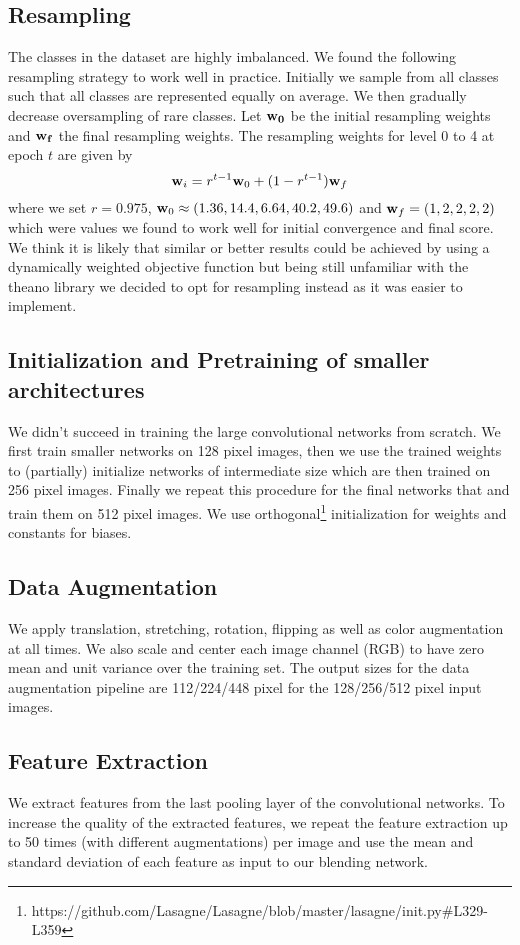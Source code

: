 \documentclass[12pt,a4paper]{scrartcl}
\begin{document}
\subsection{Resampling}
The classes in the dataset are highly imbalanced. We found the following resampling strategy to work well in practice. Initially we sample from all classes such that all classes are represented equally on average. We then gradually decrease oversampling of rare classes. Let ${\bf w_0}$ be the initial resampling weights and ${\bf w_f}$ the final resampling weights. The resampling weights for level 0 to 4 at epoch $t$ are given by
\begin{equation}
{\bf w}_i = r^{t-1} {\bf w}_0 + (1 - r^{t-1}) {\bf w}_f
\end{equation}
where we set $r=0.975$, ${\bf w}_0 \approx (1.36, 14.4, 6.64, 40.2, 49.6)$ and ${\bf w}_f = (1, 2, 2, 2, 2)$ which were values we found to work well for initial convergence and final score. We think it is likely that similar or better results could be achieved by using a dynamically weighted objective function but being still unfamiliar with the theano library we decided to opt for resampling instead as it was easier to implement.
\subsection{Initialization and Pretraining of smaller architectures}
We didn't succeed in training the large convolutional networks from scratch. We first train smaller networks on 128 pixel images, then we use the trained weights to (partially) initialize networks of intermediate size which are then trained on 256 pixel images. Finally we repeat this procedure for the final networks that and train them on 512 pixel images. We use orthogonal\footnote{https://github.com/Lasagne/Lasagne/blob/master/lasagne/init.py\#L329-L359} initialization for weights and constants for biases.
\subsection{Data Augmentation}
We apply translation, stretching, rotation, flipping as well as color augmentation at all times. We also scale and center each image channel (RGB) to have zero mean and unit variance over the training set. The output sizes for the data augmentation pipeline are 112/224/448 pixel for the 128/256/512 pixel input images. 
\subsection{Feature Extraction}
We extract features from the last pooling layer of the convolutional networks. To increase the quality of the extracted features, we repeat the feature extraction up to 50 times (with different augmentations) per image and use the mean and standard deviation of each feature as input to our blending network.
\end{document}
